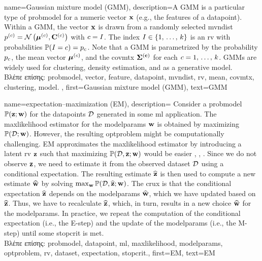 {name={Gaussian mixture model (GMM)}, 
	description={A GMM 
		is a particular type of \gls{probmodel} for a numeric \gls{vector} ${\bf x}$ (e.g., 
		the \gls{feature}s of a \gls{datapoint}). Within a GMM, the \gls{vector} ${\bf x}$ is drawn from a randomly 
		selected \gls{mvndist} $p^{(c)} = \mathcal{N}\left({\bm \mu}^{(c)},\mathbf{C}^{(c)}\right)$ with 
		$c = I$. The index $I \in \{1, \,\ldots, \,k\}$ is an \gls{rv} with probabilities $\mathbb{P}({I=c}) = p_{c}$.
	     	Note that a GMM is parametrized by the \gls{probability} $p_{c}$, the 
		\gls{mean} \gls{vector} ${\bm \mu}^{(c)}$, and the \gls{covmtx} $\bf\Sigma^{(c)}$ for each $c=1, \,\ldots, \,k$. 
		GMMs are widely used for \gls{clustering}, density estimation, and as a generative \gls{model}.\\
		\foreignlanguage{greek}{Βλέπε επίσης:} \gls{probmodel}, \gls{vector}, \gls{feature}, \gls{datapoint}, \gls{mvndist}, \gls{rv}, 
		\gls{mean}, \gls{covmtx}, \gls{clustering}, \gls{model}. },
	first={Gaussian mixture model (GMM)},
	text={GMM} 
}
	 
{name={expectation–maximization (EM)}, 
	description={ 
		Consider a \gls{probmodel} $\mathbb{P}({{\bf z}; {\bf w}})$ for the \gls{datapoint}s $\mathcal{D}$ generated in some 
		\gls{ml} application. The \gls{maxlikelihood} estimator for the \gls{modelparams} ${\bf w}$ is obtained by maximizing 
		$\mathbb{P}({\mathcal{D}; {\bf w}})$. However, the resulting \gls{optproblem} might be computationally 
		challenging. EM approximates the \gls{maxlikelihood} estimator by introducing a latent 
		\gls{rv} ${\bf z}$ such that maximizing $\mathbb{P}({\mathcal{D},{\bf z}; {\bf w}})$ would be 
		easier \cite{hastie01statisticallearning}, \cite{BishopBook}, \cite{GraphModExpFamVarInfWainJor}. Since we 
		do not observe ${\bf z}$, we need to estimate it from the observed \gls{dataset} $\mathcal{D}$ 
		using a conditional \gls{expectation}. The resulting estimate $\widehat{{\bf z}}$ is then used to 
		compute a new estimate $\widehat{{\bf w}}$ by solving $\max_{{\bf w}} \mathbb{P}({\mathcal{D}, \widehat{{\bf z}}; {\bf w}})$. 
		The crux is that the conditional \gls{expectation} $\widehat{{\bf z}}$ depends on the \gls{modelparams} $\widehat{{\bf w}}$, 
		which we have updated based on $\widehat{{\bf z}}$. Thus, we have to recalculate $\widehat{{\bf z}}$, 
		which, in turn, results in a new choice $\widehat{{\bf w}}$ for the \gls{modelparams}. In practice, 
		we repeat the computation of the conditional \gls{expectation} (i.e., the E-step) and the update 
		of the \gls{modelparams} (i.e., the M-step) until some \gls{stopcrit} is met.\\
		\foreignlanguage{greek}{Βλέπε επίσης:} \gls{probmodel}, \gls{datapoint}, \gls{ml}, \gls{maxlikelihood}, \gls{modelparams}, 
		\gls{optproblem}, \gls{rv}, \gls{dataset}, \gls{expectation}, \gls{stopcrit}.},
	first={EM},
  	text={EM}
}

